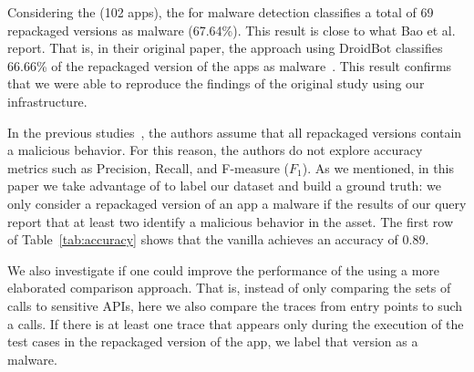 Considering the \sds (102 apps), the \mas for malware detection 
classifies a total of 69 repackaged versions as malware (67.64\%).
This result is close to what Bao et al. report. That is, in their
original paper,  the \mas approach using DroidBot classifies 66.66\% of the
repackaged version of the apps as malware~\cite{DBLP:conf/wcre/BaoLL18}.
This result confirms that we were able to reproduce
the findings of the original study using our
infrastructure. 


In the previous studies~\cite{DBLP:conf/wcre/BaoLL18,DBLP:journals/jss/CostaMMSSBNR22},
the authors assume that all repackaged versions contain a
malicious behavior. For this reason, the authors do not
explore accuracy metrics such as Precision, Recall, and
F-measure ($F_1$). As we mentioned, in this paper we take advantage
of \vt to label our dataset and build a ground truth: we only
consider a repackaged version of an app a malware if the results
of our \vt query report that at least two
\ses identify a malicious behavior in the asset.
The first row of Table~\ref{tab:accuracy} shows that the
vanilla \mas achieves an accuracy of 0.89. 

\begin{table}[htb]
  \caption{Accuracy of the \mas in both datasets.}
  \label{tab:accuracy}
\end{table}

We also investigate if one could improve the performance of
the \mas using a more elaborated comparison approach.
That is, instead of only comparing the sets of calls to sensitive APIs,
here we also compare the traces from entry points to such a calls. If there is
at least one trace that appears only during the execution of the
test cases in the repackaged version of the app, we
label that version as a malware.

